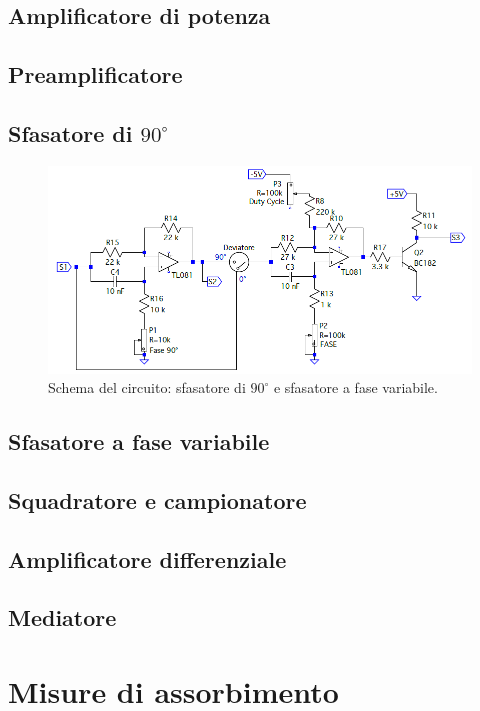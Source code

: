 \documentclass[a4paper,10pt]{article}
\begin{document}
\subsection{Amplificatore di potenza}

\subsection{Preamplificatore}

\subsection{Sfasatore di $90^\circ$}

\begin{figure}[H]
	\centering
	\includegraphics[width=\textwidth]{../grafici/Dephaser.png}
	\caption{Schema del circuito: sfasatore di $90^\circ$ e sfasatore a fase variabile.}
	\label{fig:deph}
\end{figure}

\subsection{Sfasatore a fase variabile}

\subsection{Squadratore e campionatore}

\subsection{Amplificatore differenziale}

\subsection{Mediatore}

\section{Misure di assorbimento}
\end{document}
